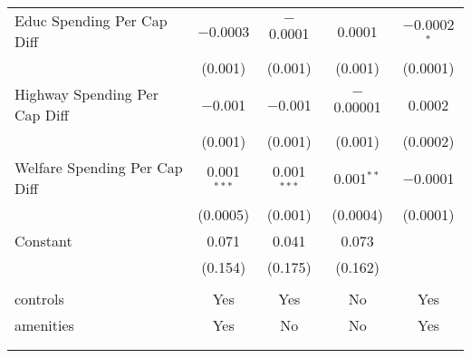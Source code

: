 \begin{table}[!htbp]
\begin{tabular}{@{\extracolsep{5pt}}lcccc}
  Educ Spending Per Cap Diff & $-$0.0003 & $-$0.0001 & 0.0001 & $-$0.0002$^{*}$ \\ 
  & (0.001) & (0.001) & (0.001) & (0.0001) \\ 
  Highway Spending Per Cap Diff & $-$0.001 & $-$0.001 & $-$0.00001 & 0.0002 \\ 
  & (0.001) & (0.001) & (0.001) & (0.0002) \\ 
  Welfare Spending Per Cap Diff & 0.001$^{***}$ & 0.001$^{***}$ & 0.001$^{**}$ & $-$0.0001 \\ 
  & (0.0005) & (0.001) & (0.0004) & (0.0001) \\ 
  Constant & 0.071 & 0.041 & 0.073 &  \\ 
  & (0.154) & (0.175) & (0.162) &  \\ 
 \hline \\[-1.8ex] 
controls & Yes & Yes & No & Yes \\ 
amenities & Yes & No & No & Yes \\ 
\hline \\[-1.8ex] 
\hline 
\hline \\[-1.8ex] 
\end{tabular} 
\end{table} 
